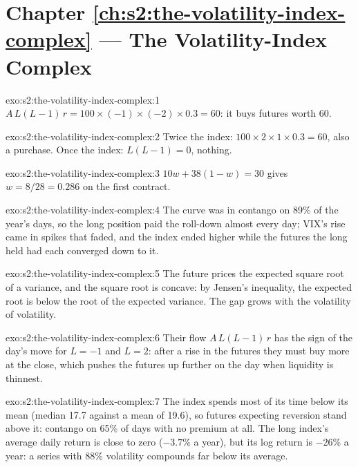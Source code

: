 \section*{Chapter \ref{ch:s2:the-volatility-index-complex} --- The Volatility-Index Complex}

\begin{solution}{exo:s2:the-volatility-index-complex:1}
$A\,L(L - 1)\,r = 100 \times (-1) \times (-2) \times 0.3 = 60$: it buys futures worth 60.
\end{solution}

\begin{solution}{exo:s2:the-volatility-index-complex:2}
Twice the index: $100 \times 2 \times 1 \times 0.3 = 60$, also a purchase. Once the index: $L(L - 1) = 0$, nothing.
\end{solution}

\begin{solution}{exo:s2:the-volatility-index-complex:3}
$10w + 38(1 - w) = 30$ gives $w = 8/28 = 0.286$ on the first contract.
\end{solution}

\begin{solution}{exo:s2:the-volatility-index-complex:4}
The curve was in contango on 89\% of the year's days, so the long position paid the roll-down almost every day; VIX's rise came in spikes that
faded, and the index ended higher while the futures the long held had each converged down to it.
\end{solution}

\begin{solution}{exo:s2:the-volatility-index-complex:5}
The future prices the expected square root of a variance, and the square root is concave: by Jensen's inequality, the expected root is below the root
of the expected variance. The gap grows with the volatility of volatility.
\end{solution}

\begin{solution}{exo:s2:the-volatility-index-complex:6}
Their flow $A\,L(L - 1)\,r$ has the sign of the day's move for $L = -1$ and $L = 2$: after a rise in the futures they must buy more at the close,
which pushes the futures up further on the day when liquidity is thinnest.
\end{solution}

\begin{solution}{exo:s2:the-volatility-index-complex:7}
The index spends most of its time below its mean (median 17.7 against a mean of 19.6), so futures expecting reversion stand above it: contango on 65\%
of days with no premium at all. The long index's average daily return is close to zero ($-3.7\%$ a year), but its log return is $-26\%$ a year:
a series with 88\% volatility compounds far below its average.
\end{solution}

